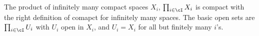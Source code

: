 \begin{remark}
   The product of infinitely many compact spaces $X_i$, $\prod_{i \in \cI} X_i$ is compact with the right definition of comapct for infinitely many spaces. The basic open sets are $\prod_{i \in \cI} U_i$ with $U_i$ open in $X_i$, and $U_i = X_i$ for all but finitely many $i$'s.
\end{remark}
